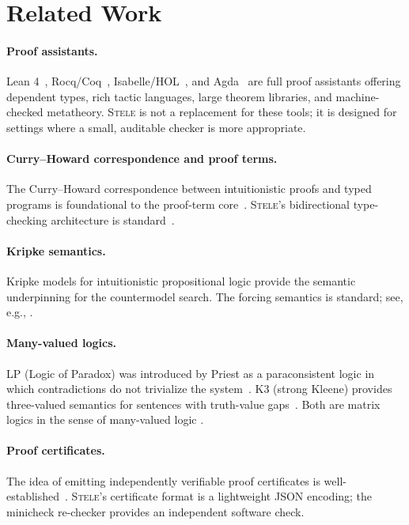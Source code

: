 \documentclass[11pt,a4paper]{article}
\theoremstyle{definition}
\theoremstyle{plain}
\newcommand{\stele}{\textsc{Stele}}
\begin{document}
\section{Related Work}
\label{sec:related}

\paragraph{Proof assistants.}
Lean 4~\cite{Moura2021}, Rocq/Coq~\cite{Rocq},
Isabelle/HOL~\cite{Nipkow2002}, and Agda~\cite{Norell2009}
are full proof assistants offering dependent types, rich tactic
languages, large theorem libraries, and machine-checked
metatheory.
\stele{} is not a replacement for these tools; it is designed
for settings where a small, auditable checker is more
appropriate.

\paragraph{Curry--Howard correspondence and proof terms.}
The Curry--Howard correspondence between intuitionistic proofs
and typed programs is foundational to the proof-term
core~\cite{SorensenUrzyczyn2006}.
\stele{}'s bidirectional type-checking architecture is
standard~\cite{PierceT98}.

\paragraph{Kripke semantics.}
Kripke models for intuitionistic propositional logic provide the
semantic underpinning for the countermodel search.
The forcing semantics is standard; see, e.g., \cite{TroelstraVanDalen1988}.

\paragraph{Many-valued logics.}
LP (Logic of Paradox) was introduced by Priest as a
paraconsistent logic in which contradictions do not trivialize
the system~\cite{Priest1979}.
K3 (strong Kleene) provides three-valued semantics for
sentences with truth-value gaps~\cite{Kleene1952}.
Both are matrix logics in the sense of many-valued logic
\cite{Malinowski1993}.

\paragraph{Proof certificates.}
The idea of emitting independently verifiable proof certificates
is well-established~\cite{HarperHP1993}.
\stele{}'s certificate format is a lightweight JSON encoding;
the minicheck re-checker provides an independent software check.
\end{document}
